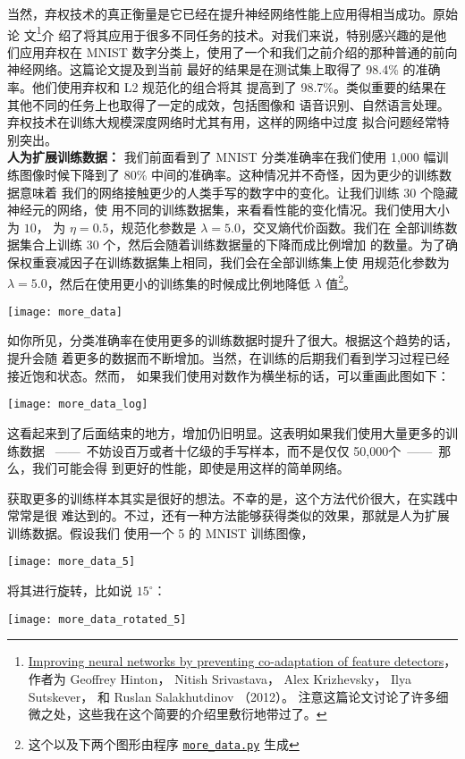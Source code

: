 当然，弃权技术的真正衡量是它已经在提升神经网络性能上应用得相当成功。原始论
文\footnote{\href{http://arxiv.org/pdf/1207.0580.pdf}{Improving neural networks
    by preventing co-adaptation of feature detectors}， 作者为 Geoffrey Hinton， Nitish
  Srivastava， Alex Krizhevsky， Ilya Sutskever， 和 Ruslan Salakhutdinov
  （2012）。 注意这篇论文讨论了许多细微之处，这些我在这个简要的介绍里敷衍地带过了。}介
绍了将其应用于很多不同任务的技术。对我们来说，特别感兴趣的是他们应用弃权在 MNIST
数字分类上，使用了一个和我们之前介绍的那种普通的前向神经网络。这篇论文提及到当前
最好的结果是在测试集上取得了 98.4\% 的准确率。他们使用弃权和 L2 规范化的组合将其
提高到了 98.7\%。类似重要的结果在其他不同的任务上也取得了一定的成效，包括图像和
语音识别、自然语言处理。弃权技术在训练大规模深度网络时尤其有用，这样的网络中过度
拟合问题经常特别突出。\\

\textbf{人为扩展训练数据：} 我们前面看到了 MNIST 分类准确率在我们使用 1,000 幅训
练图像时候下降到了 80\% 中间的准确率。这种情况并不奇怪，因为更少的训练数据意味着
我们的网络接触更少的人类手写的数字中的变化。让我们训练 30 个隐藏神经元的网络，使
用不同的训练数据集，来看看性能的变化情况。我们使用\minibatch{}大小为 $10$，
\learningrate{}为 $\eta=0.5$，规范化参数是 $\lambda=5.0$，交叉熵代价函数。我们在
全部训练数据集合上训练 30 个\epochs{}，然后会随着训练数据量的下降而成比例增加
\epochs{}的数量。为了确保权重衰减因子在训练数据集上相同，我们会在全部训练集上使
用规范化参数为 $\lambda = 5.0$，然后在使用更小的训练集的时候成比例地降低
$\lambda$ 值\footnote{这个以及下两个图形由程序
  \href{https://github.com/mnielsen/neural-networks-and-deep-learning/blob/master/fig/more_data.py}{\lstinline!more_data.py!}
  生成}。
\begin{center}
\texttt{[image: more\_data]}
\end{center}

如你所见，分类准确率在使用更多的训练数据时提升了很大。根据这个趋势的话，提升会随
着更多的数据而不断增加。当然，在训练的后期我们看到学习过程已经接近饱和状态。然而，
如果我们使用对数作为横坐标的话，可以重画此图如下：
\begin{center}
\texttt{[image: more\_data\_log]}
\end{center}

这看起来到了后面结束的地方，增加仍旧明显。这表明如果我们使用大量更多的训练数据
~——~不妨设百万或者十亿级的手写样本，而不是仅仅 50,000个~——~那么，我们可能会得
到更好的性能，即使是用这样的简单网络。

获取更多的训练样本其实是很好的想法。不幸的是，这个方法代价很大，在实践中常常是很
难达到的。不过，还有一种方法能够获得类似的效果，那就是人为扩展训练数据。假设我们
使用一个 5 的 MNIST 训练图像，
\begin{center}
  \texttt{[image: more\_data\_5]}
\end{center}
将其进行旋转，比如说 $15^{\circ}$：
\begin{center}
  \texttt{[image: more\_data\_rotated\_5]}
\end{center}

